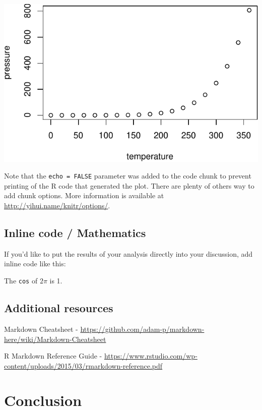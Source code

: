 \documentclass[12pt,twoside]{reedthesis}
\begin{document}
  \begin{CodeChunk}
  
  
  \begin{center}\includegraphics{skeleton_files/figure-latex/pressure-1} \end{center}
  
  \end{CodeChunk}
  
  Note that the \texttt{echo\ =\ FALSE} parameter was added to the code
  chunk to prevent printing of the R code that generated the plot. There
  are plenty of others way to add chunk options. More information is
  available at \url{http://yihui.name/knitr/options/}.
  
  \section{Inline code / Mathematics}\label{inline-code-mathematics}
  
  If you'd like to put the results of your analysis directly into your
  discussion, add inline code like this:
  
  The \texttt{cos} of \(2 \pi\) is 1.
  
  \section{Additional resources}\label{additional-resources}
  
  Markdown Cheatsheet -
  \url{https://github.com/adam-p/markdown-here/wiki/Markdown-Cheatsheet}
  
  R Markdown Reference Guide -
  \url{https://www.rstudio.com/wp-content/uploads/2015/03/rmarkdown-reference.pdf}
  
  \chapter*{Conclusion}
  
\end{document}
